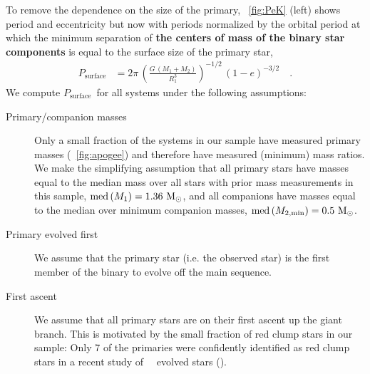 \documentclass[modern, letterpaper]{aastex62}
\newcommand{\apogee}{\project{\acronym{APOGEE}}}
\newcommand{\DR}{\acronym{DR14}}
\newcommand{\med}[1]{\ensuremath{\textrm{med}\left(#1\right)}}
\newcommand{\Psurf}{\ensuremath{P_\textrm{surface}}}
\renewcommand{\changes}[1]{\textbf{#1}}
\begin{document}
To remove the dependence on the size of the primary, \figurename~\ref{fig:PeK}
(left) shows period and eccentricity but now with periods normalized by the
orbital period at which the minimum separation of \changes{the centers of mass
of the binary star components} is equal to the surface size of the primary star,
\begin{align}
    \Psurf &= 2\pi \,
        \left(\frac{G \, (M_1+M_2)}{R_1^3}\right)^{-1/2} \,
        \left(1-e\right)^{-3/2}
    \quad . \label{eq:Psurf}
\end{align}
We compute \Psurf\ for all systems under the following assumptions:
\begin{description}
    \item[Primary/companion masses] Only a small fraction of the systems in our
    sample have measured primary masses (\figurename~\ref{fig:apogee}) and
    therefore have measured (minimum) mass ratios.
    We make the simplifying assumption that all primary stars have masses equal
    to the median mass over all stars with prior mass measurements in this
    sample, $\med{M_1} = 1.36~\msun$, and all companions have masses equal to
    the median over minimum companion masses, $\med{M_{2, \textrm{min}}} =
    0.5~\msun$.
    \item[Primary evolved first] We assume that the primary star (i.e. the
    observed star) is the first member of the binary to evolve off the main
    sequence.
    \item[First ascent] We assume that all primary stars are on their first
    ascent up the giant branch.
    This is motivated by the small fraction of red clump stars in our sample:
    Only 7 of the primaries were confidently identified as red clump stars in a
    recent study of \apogee\ \DR\ evolved stars (\citealt{Ting:2018}).
\end{description}
\end{document}
